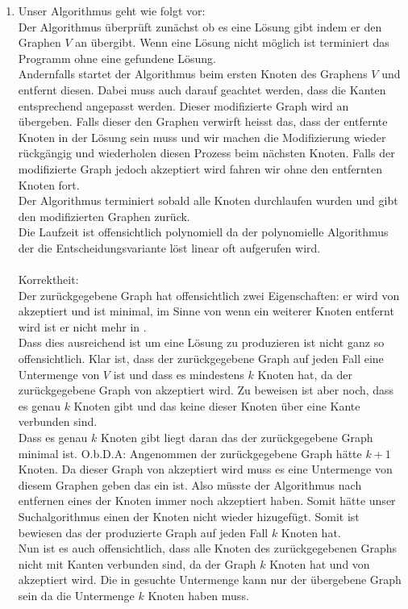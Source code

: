 \documentclass[a4paper,11pt]{scrartcl}
\begin{document}
\begin{enumerate}[label=\alph*)]
	\item	Unser Algorithmus geht wie folgt vor:\\
		Der Algorithmus überprüft zunächst ob es eine Lösung gibt indem er den Graphen $V$ an  übergibt. Wenn eine Lösung nicht möglich ist terminiert das Programm ohne eine gefundene Lösung.\\
		Andernfalls startet der Algorithmus beim ersten Knoten des Graphens $V$ und entfernt diesen. Dabei muss auch darauf geachtet werden, dass die Kanten entsprechend angepasst werden. Dieser modifizierte Graph wird an  übergeben. Falls dieser den Graphen verwirft heisst das, dass der entfernte Knoten in der Lösung sein muss und wir machen die Modifizierung wieder rückgängig und wiederholen diesen Prozess beim nächsten Knoten. Falls der modifizierte Graph jedoch akzeptiert wird fahren wir ohne den entfernten Knoten fort.\\
		Der Algorithmus terminiert sobald alle Knoten durchlaufen wurden und gibt den modifizierten Graphen zurück.\\
		Die Laufzeit ist offensichtlich polynomiell da der polynomielle Algorithmus der die Entscheidungsvariante löst linear oft aufgerufen wird.\\
		\\
		Korrektheit:\\
		Der zurückgegebene Graph hat offensichtlich zwei Eigenschaften: er wird von  akzeptiert und ist minimal, im Sinne von wenn ein weiterer Knoten entfernt wird ist er nicht mehr in .\\
		Dass dies ausreichend ist um eine Lösung zu produzieren ist nicht ganz so offensichtlich. Klar ist, dass der zurückgegebene Graph auf jeden Fall eine Untermenge von $V$ ist und dass es mindestens $k$ Knoten hat, da der zurückgegebene Graph von  akzeptiert wird. Zu beweisen ist aber noch, dass es genau $k$ Knoten gibt und das keine dieser Knoten über eine Kante verbunden sind.\\
		Dass es genau $k$ Knoten gibt liegt daran das der zurückgegebene Graph minimal ist. O.b.D.A: Angenommen der zurückgegebene Graph hätte $k+1$ Knoten. Da dieser Graph von  akzeptiert wird muss es eine Untermenge von diesem Graphen geben das ein  ist. Also müsste der Algorithmus  nach entfernen eines der Knoten immer noch akzeptiert haben. Somit hätte unser Suchalgorithmus einen der Knoten nicht wieder hizugefügt. Somit ist bewiesen das der produzierte Graph auf jeden Fall $k$ Knoten hat.\\
		Nun ist es auch offensichtlich, dass alle Knoten des zurückgegebenen Graphs nicht mit Kanten verbunden sind, da der Graph $k$ Knoten hat und von  akzeptiert wird. Die in  gesuchte Untermenge  kann nur der übergebene Graph sein da die Untermenge $k$ Knoten haben muss.		
	\end{enumerate}
	
\end{document}
